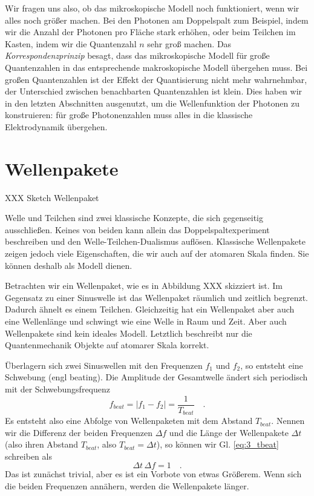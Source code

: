 Wir fragen uns also, ob das mikroskopische Modell noch funktioniert, wenn wir alles noch größer machen. Bei den Photonen am Doppelspalt zum Beispiel, indem wir die Anzahl der Photonen pro Fläche stark erhöhen, oder beim Teilchen im Kasten, indem wir die Quantenzahl $n$ sehr groß machen. Das \emph{Korrespondenzprinzip} besagt, dass das mikroskopische Modell für große Quantenzahlen in das entsprechende makroskopische Modell übergehen muss. Bei großen Quantenzahlen ist der Effekt der Quantisierung nicht mehr wahrnehmbar, der Unterschied zwischen benachbarten Quantenzahlen ist klein. Dies haben wir in den letzten Abschnitten ausgenutzt, um die Wellenfunktion der Photonen zu konstruieren: für große Photonenzahlen muss alles in die klassische Elektrodynamik übergehen.



\section{Wellenpakete}

\begin{marginfigure}
    \caption{XXX Sketch Wellenpaket}
\end{marginfigure}

Welle und Teilchen sind zwei klassische Konzepte, die sich gegenseitig ausschließen. Keines von beiden kann allein das Doppelspaltexperiment beschreiben und den Welle-Teilchen-Dualismus auflösen. Klassische Wellenpakete zeigen jedoch viele Eigenschaften, die wir auch auf der atomaren Skala finden. Sie können deshalb als Modell dienen.

Betrachten wir ein Wellenpaket, wie es in Abbildung XXX skizziert ist. Im Gegensatz zu einer Sinuswelle ist das Wellenpaket räumlich und zeitlich begrenzt. Dadurch ähnelt es einem Teilchen. Gleichzeitig hat ein Wellenpaket aber auch eine Wellenlänge und schwingt wie eine Welle in Raum und Zeit. Aber auch Wellenpakete sind kein ideales Modell. Letztlich beschreibt nur die Quantenmechanik Objekte auf atomarer Skala korrekt.

Überlagern sich zwei Sinuswellen mit den Frequenzen $f_1$ und $f_2$, so entsteht eine Schwebung (engl beating). Die Amplitude der Gesamtwelle ändert sich periodisch mit der Schwebungsfrequenz
\begin{equation}
    f_{beat} = | f_1 - f_2 | = \frac{1}{T_{beat}} \quad . \label{eq:3_tbeat}
\end{equation}
Es entsteht also eine Abfolge von Wellenpaketen mit dem Abstand $T_{beat}$. Nennen wir die Differenz der beiden Frequenzen $\Delta f$ und die Länge der Wellenpakete $\Delta t$ (also ihren Abstand $T_{beat}$, also $T_{beat} = \Delta t$), so können wir Gl. \ref{eq:3_tbeat} schreiben als
\begin{equation}
    \Delta t \, \Delta f = 1 \quad .
\end{equation}
Das ist zunächst trivial, aber es ist ein Vorbote von etwas Größerem. Wenn sich die beiden Frequenzen annähern, werden die Wellenpakete länger.

